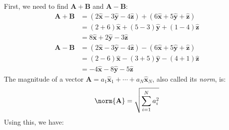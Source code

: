             \begin{solution}
                First, we need to find $\mathbf{A}+\mathbf{B}$
                and $\mathbf{A}-\mathbf{B}$:
                \begin{subequations}
                    \begin{align}
                        \mathbf{A}+\mathbf{B}
                        &=(2\hat{\mathbf{x}}
                            -3\hat{\mathbf{y}}
                            -4\hat{\mathbf{z}})+
                            (6\hat{\mathbf{x}}
                            +5\hat{\mathbf{y}}
                             +\hat{\mathbf{z}})\\
                        &=(2+6)\hat{\mathbf{x}}
                         +(5-3)\hat{\mathbf{y}}
                         +(1-4)\hat{\mathbf{z}}\\
                        &=8\hat{\mathbf{x}}
                         +2\hat{\mathbf{y}}
                         -3\hat{\mathbf{z}}
                    \end{align}
                \end{subequations}
                \begin{subequations}
                    \begin{align}
                        \mathbf{A}-\mathbf{B}
                        &=(2\hat{\mathbf{x}}
                          -3\hat{\mathbf{y}}
                          -4\hat{\mathbf{z}})
                          -(6\hat{\mathbf{x}}
                           +5\hat{\mathbf{y}}
                            +\hat{\mathbf{z}})\\
                        &=(2-6)\hat{\mathbf{x}}
                         -(3+5)\hat{\mathbf{y}}
                         -(4+1)\hat{\mathbf{z}}\\
                        &=-4\hat{\mathbf{x}}
                          -8\hat{\mathbf{y}}
                          -5\hat{\mathbf{z}}
                    \end{align}
                \end{subequations}
                The magnitude of a vector
                $\mathbf{A}=a_{1}\hat{\mathbf{x}}_{1}%
                 +\cdots+a_{N}\hat{\mathbf{x}}_{N}$,
                also called its \textit{norm}, is:
                \begin{equation}
                    \norm{\mathbf{A}}=\sqrt{\sum_{i=1}^{N}a_{i}^{2}}
                \end{equation}
                Using this, we have:
                \par

\end{solution}
